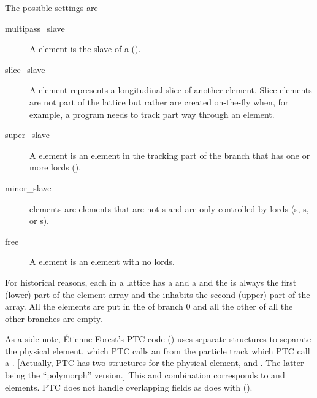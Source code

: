 The possible  settings are
  \begin{description}
  \item[multipass_slave]\Newline
A  element is the slave of a 
().
  \item[slice_slave]\Newline
A  element represents a longitudinal slice of another element.
Slice elements are not part of the lattice but rather are created on-the-fly
when, for example, a program needs to track part way through an element.
  \item[super_slave]\Newline 
A  element is an element in the tracking part of the branch that 
has one or more  lords ().
  \item[minor_slave]\Newline
{} elements are elements that are not s and are only controlled
by  lords (s, s, or s).
  \item[free]\Newline
A  element is an element with no lords.
  \end{description}

For historical reasons, each  in a lattice has a  and a  and the  is always the first (lower) part of the element array and the
 inhabits the second (upper) part of the array.  All the  elements are put
in the  of branch 0 and all the other  of all the other branches
are empty.

As a side note, \'Etienne Forest's PTC code () uses separate structures to
separate the physical element, which PTC calls an  from the particle track which PTC
call a .  [Actually, PTC has two structures for the physical element,  and
. The latter being the ``polymorph'' version.] This  and 
combination corresponds to \bmad {} and  elements. PTC does not
handle overlapping fields as \bmad does with  ().

